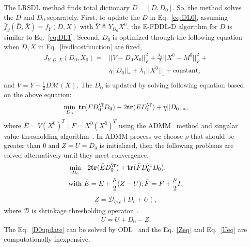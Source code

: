 The LRSDL method finds total dictionary $\bar{D} = [D, D_0]$. So, the method solves the $D$ and $D_0$ separately. First, to update the $D$ in Eq.~\eqref{eq:DL0}, assuming $\bar{f}_y(\bar{D}, \bar{X}) = f_Y(D,X) $ with $\bar{Y} \triangleq Y_ {D_0}X^0$, the E-FDDL-D algorithm for $D$ is similar to Eq.~\eqref{eq:DL1}. Second, $D_0$ is optimized through the following equation when $D, X$ in Eq.~\eqref{lrsdlcostfunction} are fixed,
\begin{equation}
\begin{aligned}
\bar{J}_{Y,D,X}(D_0,X_0) = & ||V-D_0X_0||_F^2 + \frac{\lambda_2}{2} ||X^0 - M^0||_F^2 + \\ 
 & \eta||D_0||_* + \lambda_1||X^0||_1 + \text{constant},\\
\end{aligned}
\label{eq:DL4}
\end{equation}
and $V = Y- \frac{1}{2}D\mathcal{M}(X)$. 
The $D_0$ is updated by solving following equation based on the above equation:
\begin{equation}
\begin{aligned}
\min_{D_0} \ \textbf{tr}(FD_0^\T D_0) -2 \textbf{tr}(ED_0^\T)+ \eta ||D_0||_*,
\end{aligned}
\label{eq:DL5}
\end{equation}
where $E=V(X^0)^T$ ; $F = X^0(X^0)^T$ using the ADMM~\cite{boyd2011distributed36} method and singular value thresholding algorithm~\cite{cai2010singular}. In ADMM process we choose $\rho$ that should be greater than 0 and $Z = U = D_0$ is initialized, then the following problems are solved alternatively until they meet convergence.
\begin{equation}
\begin{aligned}
& \min_{D_0} - 2\textbf{tr}(\bar{E}D_0^\T) + \textbf{tr}(\bar{F}D_0^\T D_0), \\
& \text{with }\bar{E} = E+\frac{\rho}{2}(Z-U);  \bar{F} = F+\frac{\rho}{2}I,\\
\end{aligned}
\label{D0update}
\end{equation}
\begin{equation}
\begin{aligned}
Z = \mathcal{D_{\eta/\rho}}(D_c+U),
\end{aligned}
\label{Zeq}
\end{equation}
where $\mathcal{D}$ is shrinkage thresholding operator~\cite{cai2010singular}.
\begin{equation}
\begin{aligned}
U = U+D_0-Z.
\end{aligned}
\label{Ueq}
\end{equation}
The Eq.~\eqref{D0update} can be solved by ODL~\cite{mairal2010online} and the Eq.~\eqref{Zeq} and Eq.~\eqref{Ueq} are computationally inexpensive.

